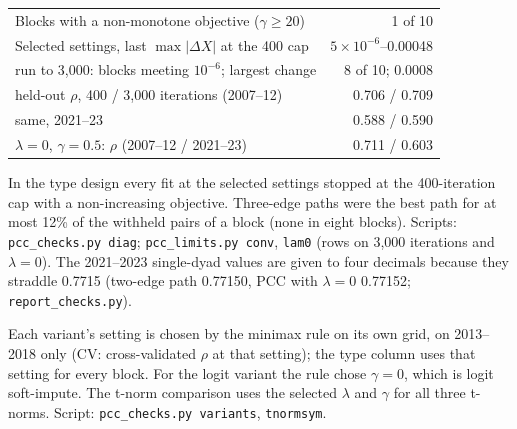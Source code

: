 \documentclass[journal]{IEEEtran}
\begin{document}
\begin{table}[!t]
\begin{tabular}{@{}l r@{}}
Blocks with a non-monotone objective ($\gamma\ge20$) & 1 of 10\\
Selected settings, last $\max|\Delta X|$ at the 400 cap & $5\times10^{-6}$--0.00048\\
\quad run to 3,000: blocks meeting $10^{-6}$; largest change & 8 of 10; 0.0008\\
\quad held-out $\rho$, 400 / 3,000 iterations (2007--12) & 0.706 / 0.709\\
\quad same, 2021--23 & 0.588 / 0.590\\
$\lambda=0$, $\gamma=0.5$: $\rho$ (2007--12 / 2021--23) & 0.711 / 0.603\\
\bottomrule
\end{tabular}
\smallskip
\parbox{\columnwidth}{\scriptsize In the type design every fit at the selected settings stopped at the 400-iteration cap with a non-increasing objective. Three-edge paths were the best path for at most 12\% of the withheld pairs of a block (none in eight blocks). Scripts: \texttt{pcc\_checks.py diag}; \texttt{pcc\_limits.py conv}, \texttt{lam0} (rows on 3,000 iterations and $\lambda=0$). The 2021--2023 single-dyad values are given to four decimals because they straddle 0.7715 (two-edge path 0.77150, PCC with $\lambda=0$ 0.77152; \texttt{report\_checks.py}).}
\end{table}

\setcounter{table}{27}\begin{table}[!t]
\caption{Variants of PCC and the t-Norm Inside It}
\centering\scriptsize
\setlength{\tabcolsep}{2.5pt}
\smallskip
\parbox{\columnwidth}{\scriptsize Each variant's setting is chosen by the minimax rule on its own grid, on 2013--2018 only (CV: cross-validated $\rho$ at that setting); the type column uses that setting for every block. For the logit variant the rule chose $\gamma=0$, which is logit soft-impute. The t-norm comparison uses the selected $\lambda$ and $\gamma$ for all three t-norms. Script: \texttt{pcc\_checks.py variants}, \texttt{tnormsym}.}
\end{table}
\end{document}

